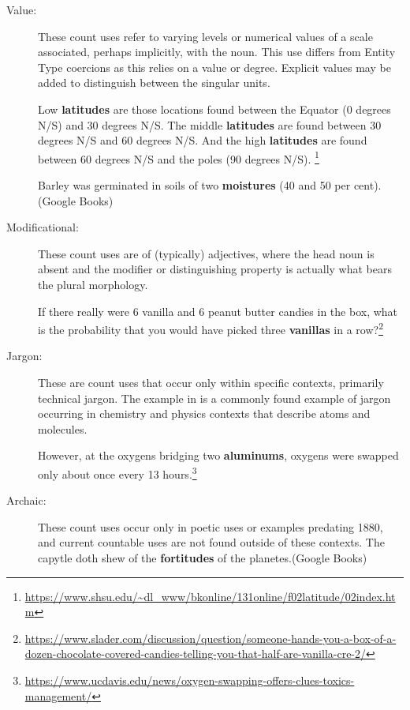 \documentclass[output=paper]{langscibook}
\begin{document}
\begin{description}
\item[Value:] These count uses refer to varying levels or numerical values of a scale associated, perhaps implicitly, with the noun. This use differs from Entity Type coercions as this relies on a value or degree. Explicit values may be added to distinguish between the singular units.

\eanoraggedright \label{gri-ric:ex:latitudes} Low \textbf{latitudes} are those locations found between the Equator (0 degrees N/S) and 30 degrees N/S. The middle \textbf{latitudes} are found between 30 degrees N/S and 60 degrees N/S. And the high \textbf{latitudes} are found between 60 degrees N/S and the poles (90 degrees N/S). \footnote{\url{https://www.shsu.edu/~dl_www/bkonline/131online/f02latitude/02index.htm}} \z

\eanoraggedright \label{gri-ric:ex:moistures} Barley was germinated in soils of two \textbf{moistures} (40 and 50 per cent). \hfill (Google Books) \z


\item[Modificational:] These count uses are of (typically) adjectives, where the head noun is absent and the modifier or distinguishing property is actually what bears the plural morphology.

\eanoraggedright \label{gri-ric:ex:vanillas} If there really were 6 vanilla and 6 peanut butter candies in the box, what is the probability that you would have picked three \textbf{vanillas} in a row?\footnote{\url{https://www.slader.com/discussion/question/someone-hands-you-a-box-of-a-dozen-chocolate-covered-candies-telling-you-that-half-are-vanilla-cre-2/}} \z


\item[Jargon:] These are count uses that  occur only within specific contexts, primarily technical jargon. The example in  is a commonly found example of jargon occurring in chemistry and physics contexts that describe atoms and molecules.

\eanoraggedright \label{gri-ric:ex:oxygens}
However, at the oxygens bridging two \textbf{aluminums}, oxygens were swapped only about once every 13 hours.\footnote{\url{https://www.ucdavis.edu/news/oxygen-swapping-offers-clues-toxics-management/}}
\z 



\item[Archaic:] These count uses occur only in poetic uses or examples predating 1880, and current countable uses are not found outside of these contexts. 
\eanoraggedright 
The capytle doth shew of the \textbf{fortitudes} of the planetes.\hfill (Google Books)
\z



\end{description}
\end{document}
